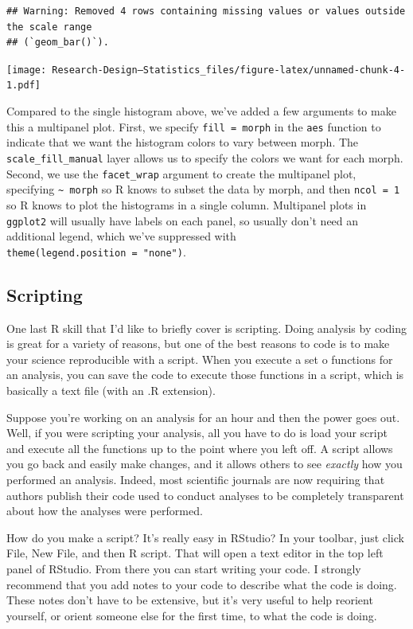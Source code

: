 \documentclass[
]{book}
\begin{document}
\begin{verbatim}
## Warning: Removed 4 rows containing missing values or values outside the scale range
## (`geom_bar()`).
\end{verbatim}

\texttt{[image: Research-Design---Statistics\_files/figure-latex/unnamed-chunk-4-1.pdf]}

Compared to the single histogram above, we've added a few arguments to make this a multipanel plot. First, we specify \texttt{fill\ =\ morph} in the \texttt{aes} function to indicate that we want the histogram colors to vary between morph. The \texttt{scale\_fill\_manual} layer allows us to specify the colors we want for each morph. Second, we use the \texttt{facet\_wrap} argument to create the multipanel plot, specifying \texttt{\textasciitilde{}\ morph} so R knows to subset the data by morph, and then \texttt{ncol\ =\ 1} so R knows to plot the histograms in a single column. Multipanel plots in \texttt{ggplot2} will usually have labels on each panel, so usually don't need an additional legend, which we've suppressed with \texttt{theme(legend.position\ =\ "none")}.

\subsection{Scripting}\label{scripting}

One last R skill that I'd like to briefly cover is scripting. Doing analysis by coding is great for a variety of reasons, but one of the best reasons to code is to make your science reproducible with a script. When you execute a set o functions for an analysis, you can save the code to execute those functions in a script, which is basically a text file (with an .R extension).

Suppose you're working on an analysis for an hour and then the power goes out. Well, if you were scripting your analysis, all you have to do is load your script and execute all the functions up to the point where you left off. A script allows you go back and easily make changes, and it allows others to see \emph{exactly} how you performed an analysis. Indeed, most scientific journals are now requiring that authors publish their code used to conduct analyses to be completely transparent about how the analyses were performed.

How do you make a script? It's really easy in RStudio? In your toolbar, just click File, New File, and then R script. That will open a text editor in the top left panel of RStudio. From there you can start writing your code. I strongly recommend that you add notes to your code to describe what the code is doing. These notes don't have to be extensive, but it's very useful to help reorient yourself, or orient someone else for the first time, to what the code is doing.
\end{document}
